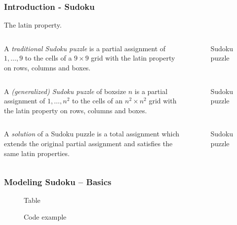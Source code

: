 \documentclass{beamer}
\begin{document}
\begin{frame}
\frametitle{Introduction - Sudoku}
  The latin property.
\end{frame}

\begin{frame}
 \begin{columns}[c] 
   A \emph{traditional Sudoku puzzle} is a partial assignment of $1,\dots,9$ to the cells of a $9\times 9$ grid with the latin property on rows, columns and boxes.
   \begin{figure}[h]
    \centering
    \sudokuexampleone
    \caption{Sudoku puzzle}
   \end{figure} 
 \end{columns}
\end{frame}

\begin{frame}
 \begin{columns}[c]
   A \emph{(generalized) Sudoku puzzle} of boxsize $n$ is a partial assignment of $1,\dots,n^2$ to the cells of an $n^2\times n^2$ grid with the latin property on rows, columns and boxes.
   \begin{figure}[h]
    \centering
    \sudokuexampleone
    \caption{Sudoku puzzle}
   \end{figure} 
 \end{columns}
\end{frame}

\begin{frame}
 \begin{columns}[c] 
   A \emph{solution} of a Sudoku puzzle is a total assignment which extends the original partial assignment and satisfies the same latin properties.
   \begin{figure}[h]
    \centering
    \sudokuexampletwo
    \caption{Sudoku puzzle}
   \end{figure} 
 \end{columns}
\end{frame}

\begin{frame}[fragile]
\frametitle{Modeling Sudoku -- Basics}
 \begin{figure}[h]
  \centering
  \librarytable
  \caption{Table}
 \end{figure} 

 \begin{figure}[h]
  \centering
  
  \caption{Code example}
 \end{figure} 
\end{frame}
\end{document}

